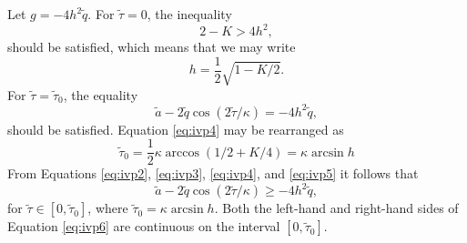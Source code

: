 \documentclass[12pt]{ociamthesis}
\begin{document}
Let $g = - 4 h^2 \tilde q$.
For $\tilde \tau = 0$, the inequality
%
\begin{equation}
\label{eq:ivp2}
2 - K > 4 h^2,
\end{equation}
%
should be satisfied, which means that we may write
%
\begin{equation}
\label{eq:ivp3}
h = \frac{1}{2}\sqrt{1 - K/2}.
\end{equation}
%
For $\tilde \tau = \tilde \tau_0$, the equality
%
\begin{equation}
\label{eq:ivp4}
\tilde{a} - 2\tilde{q}\cos(2\tilde{\tau}/\kappa) = - 4h^2\tilde{q},
\end{equation}
%
should be satisfied.
Equation \eqref{eq:ivp4} may be rearranged as
%
\begin{equation}
\label{eq:ivp5}
\tilde \tau_0 = \frac{1}{2} \kappa \arccos(1/2 + K/4) = \kappa \arcsin h
\end{equation}
%
From Equations \eqref{eq:ivp2}, \eqref{eq:ivp3}, \eqref{eq:ivp4}, and \eqref{eq:ivp5} it follows that 
%
\begin{equation}
\label{eq:ivp6}
\tilde{a} - 2\tilde{q}\cos(2\tilde{\tau}/\kappa) \geq - 4h^2\tilde{q},
\end{equation}
%
for $\tilde{\tau} \in [0,\tilde{\tau}_0]$, where $\tilde \tau_0 = \kappa \arcsin h$.
Both the left-hand and right-hand sides of Equation \eqref{eq:ivp6} are continuous on the interval $[0,\tilde{\tau}_0]$.
\end{document}
